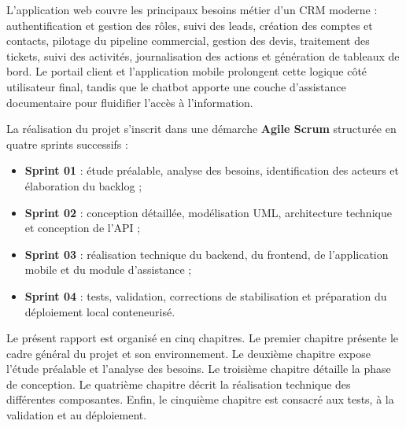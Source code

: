 L'application web couvre les principaux besoins métier d'un CRM moderne : authentification et gestion des rôles, suivi des leads, création des comptes et contacts, pilotage du pipeline commercial, gestion des devis, traitement des tickets, suivi des activités, journalisation des actions et génération de tableaux de bord. Le portail client et l'application mobile prolongent cette logique côté utilisateur final, tandis que le chatbot apporte une couche d'assistance documentaire pour fluidifier l'accès à l'information.\par
\vspace{0.3cm}

La réalisation du projet s'inscrit dans une démarche \textbf{Agile Scrum} structurée en quatre sprints successifs :
\begin{itemize}
    \item \textbf{Sprint 01} : étude préalable, analyse des besoins, identification des acteurs et élaboration du backlog ;
    \item \textbf{Sprint 02} : conception détaillée, modélisation UML, architecture technique et conception de l'API ;
    \item \textbf{Sprint 03} : réalisation technique du backend, du frontend, de l'application mobile et du module d'assistance ;
    \item \textbf{Sprint 04} : tests, validation, corrections de stabilisation et préparation du déploiement local conteneurisé.
\end{itemize}

Le présent rapport est organisé en cinq chapitres. Le premier chapitre présente le cadre général du projet et son environnement. Le deuxième chapitre expose l'étude préalable et l'analyse des besoins. Le troisième chapitre détaille la phase de conception. Le quatrième chapitre décrit la réalisation technique des différentes composantes. Enfin, le cinquième chapitre est consacré aux tests, à la validation et au déploiement.\par
